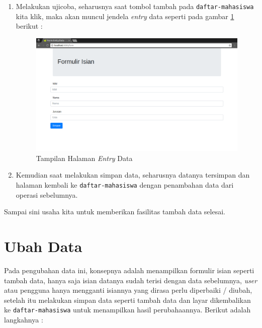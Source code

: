 \begin{enumerate}
	\item Melakukan ujicoba, seharusnya saat tombol tambah pada \texttt{daftar-mahasiswa} kita klik, maka akan muncul jendela \textit{entry} data seperti pada gambar \ref{fig:halaman-entry-data} berikut :
	
	\begin{figure}[H]
		\centering
		\includegraphics[width=1\textwidth]{./resources/035-halaman-entry-data}
		\caption{Tampilan Halaman \textit{Entry} Data}
		\label{fig:halaman-entry-data}
	\end{figure}
	
	\item Kemudian saat melakukan simpan data, seharusnya datanya tersimpan dan halaman kembali ke \texttt{daftar-mahasiswa} dengan penambahan data dari operasi sebelumnya.
	
\end{enumerate}

Sampai sini usaha kita untuk memberikan fasilitas tambah data selesai.


\section{Ubah Data}

Pada pengubahan data ini, konsepnya adalah menampilkan formulir isian seperti tambah data, hanya saja isian datanya sudah terisi dengan data sebelumnya, \textit{user} atau pengguna hanya mengganti isiannya yang dirasa perlu diperbaiki / diubah, setelah itu melakukan simpan data seperti tambah data dan layar dikembalikan ke \texttt{daftar-mahasiswa} untuk menampilkan hasil perubahaannya. Berikut adalah langkahnya :

